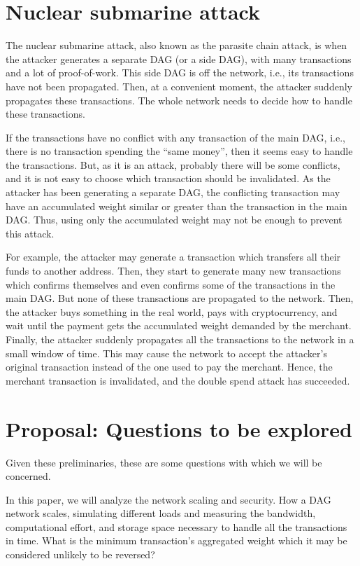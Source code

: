 \section{Nuclear submarine attack}

The nuclear submarine attack, also known as the parasite chain attack, is when the attacker generates a separate DAG (or a side DAG), with many transactions and a lot of proof-of-work. This side DAG is off the network, i.e., its transactions have not been propagated. Then, at a convenient moment, the attacker suddenly propagates these transactions. The whole network needs to decide how to handle these transactions.

If the transactions have no conflict with any transaction of the main DAG, i.e., there is no transaction spending the ``same money'', then it seems easy to handle the transactions. But, as it is an attack, probably there will be some conflicts, and it is not easy to choose which transaction should be invalidated. As the attacker has been generating a separate DAG, the conflicting transaction may have an accumulated weight similar or greater than the transaction in the main DAG. Thus, using only the accumulated weight may not be enough to prevent this attack.

For example, the attacker may generate a transaction which transfers all their funds to another address. Then, they start to generate many new transactions which confirms themselves and even confirms some of the transactions in the main DAG. But none of these transactions are propagated to the network. Then, the attacker buys something in the real world, pays with cryptocurrency, and wait until the payment gets the accumulated weight demanded by the merchant. Finally, the attacker suddenly propagates all the transactions to the network in a small window of time. This may cause the network to accept the attacker's original transaction instead of the one used to pay the merchant. Hence, the merchant transaction is invalidated, and the double spend attack has succeeded.

\section{Proposal: Questions to be explored}

Given these preliminaries, these are some questions with which we will be concerned.

In this paper, we will analyze the network scaling and security. How a DAG network scales, simulating different loads and measuring the bandwidth, computational effort, and storage space necessary to handle all the transactions in time. What is the minimum transaction's aggregated weight which it may be considered unlikely to be reversed?

